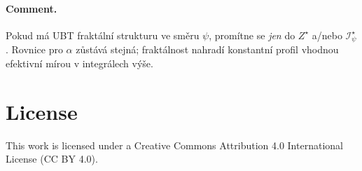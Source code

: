 \documentclass[11pt]{article}
\begin{document}
\paragraph{Comment.} Pokud má UBT fraktální strukturu ve směru $\psi$, promítne se \emph{jen} do $Z^\star$ a/nebo $\mathcal I_\psi^\star$. Rovnice pro $\alpha$ zůstává stejná; fraktálnost nahradí konstantní profil vhodnou efektivní mírou v integrálech výše.

\section*{License}
This work is licensed under a Creative Commons Attribution 4.0 International License (CC BY 4.0).
\end{document}
